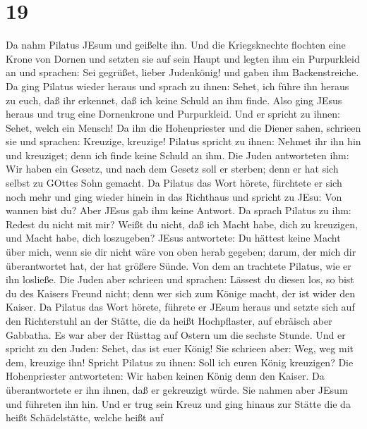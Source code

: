 \hypertarget{section-18}{%
\section{19}\label{section-18}}

 Da nahm Pilatus JEsum und geißelte ihn.  Und
die Kriegsknechte flochten eine Krone von Dornen und setzten sie auf
sein Haupt und legten ihm ein Purpurkleid an  und sprachen:
Sei gegrüßet, lieber Judenkönig! und gaben ihm Backenstreiche.
 Da ging Pilatus wieder heraus und sprach zu ihnen: Sehet,
ich führe ihn heraus zu euch, daß ihr erkennet, daß ich keine Schuld an
ihm finde.  Also ging JEsus heraus und trug eine Dornenkrone
und Purpurkleid. Und er spricht zu ihnen: Sehet, welch ein Mensch!
 Da ihn die Hohenpriester und die Diener sahen, schrieen sie
und sprachen: Kreuzige, kreuzige! Pilatus spricht zu ihnen: Nehmet ihr
ihn hin und kreuziget; denn ich finde keine Schuld an ihm. 
Die Juden antworteten ihm: Wir haben ein Gesetz, und nach dem Gesetz
soll er sterben; denn er hat sich selbst zu GOttes Sohn gemacht.
 Da Pilatus das Wort hörete, fürchtete er sich noch mehr
 und ging wieder hinein in das Richthaus und spricht zu
JEsu: Von wannen bist du? Aber JEsus gab ihm keine Antwort.
 Da sprach Pilatus zu ihm: Redest du nicht mit mir? Weißt
du nicht, daß ich Macht habe, dich zu kreuzigen, und Macht habe, dich
loszugeben?  JEsus antwortete: Du hättest keine Macht über
mich, wenn sie dir nicht wäre von oben herab gegeben; darum, der mich
dir überantwortet hat, der hat größere Sünde.  Von dem an
trachtete Pilatus, wie er ihn losließe. Die Juden aber schrieen und
sprachen: Lässest du diesen los, so bist du des Kaisers Freund nicht;
denn wer sich zum Könige macht, der ist wider den Kaiser. 
Da Pilatus das Wort hörete, führete er JEsum heraus und setzte sich auf
den Richterstuhl an der Stätte, die da heißt Hochpflaster, auf ebräisch
aber Gabbatha.  Es war aber der Rüsttag auf Ostern um die
sechste Stunde. Und er spricht zu den Juden: Sehet, das ist euer König!
 Sie schrieen aber: Weg, weg mit dem, kreuzige ihn! Spricht
Pilatus zu ihnen: Soll ich euren König kreuzigen? Die Hohenpriester
antworteten: Wir haben keinen König denn den Kaiser.  Da
überantwortete er ihn ihnen, daß er gekreuzigt würde. Sie nahmen aber
JEsum und führeten ihn hin.  Und er trug sein Kreuz und
ging hinaus zur Stätte die da heißt Schädelstätte, welche heißt auf
